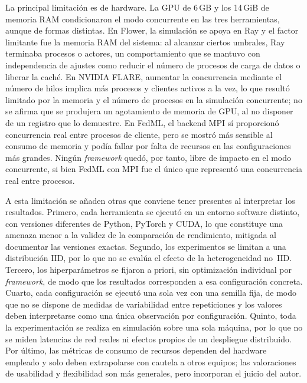 La principal limitación es de hardware. La GPU de 6\,GB y los 14\,GiB de memoria RAM condicionaron
el modo concurrente en las tres herramientas, aunque de formas distintas. En Flower, la simulación
se apoya en Ray y el factor limitante fue la memoria RAM del sistema: al alcanzar ciertos umbrales,
Ray terminaba procesos o actores, un comportamiento que se mantuvo con independencia de ajustes
como reducir el número de procesos de carga de datos o liberar la caché. En NVIDIA FLARE, aumentar
la concurrencia mediante el número de hilos implica más procesos y clientes activos a la vez, lo
que resultó limitado por la memoria y el número de procesos en la simulación concurrente; no se
afirma que se produjera un agotamiento de memoria de GPU, al no disponer de un registro que lo
demuestre. En FedML, el backend MPI sí proporcionó concurrencia real entre procesos de cliente,
pero se mostró más sensible al consumo de memoria y podía fallar por falta de recursos en las
configuraciones más grandes. Ningún \textit{framework} quedó, por tanto, libre de impacto en el
modo concurrente, si bien FedML con MPI fue el único que representó una concurrencia real entre procesos.

A esta limitación se añaden otras que conviene tener presentes al interpretar los resultados.
Primero, cada herramienta se ejecutó en un entorno software distinto, con versiones diferentes de
Python, PyTorch y CUDA, lo que constituye una amenaza menor a la validez de la comparación de
rendimiento, mitigada al documentar las versiones exactas. Segundo, los experimentos se limitan a
una distribución IID, por lo que no se evalúa el efecto de la heterogeneidad no~IID. Tercero, los
hiperparámetros se fijaron a priori, sin optimización individual por \textit{framework}, de modo
que los resultados corresponden a esa configuración concreta. Cuarto, cada configuración se
ejecutó una sola vez con una semilla fija, de modo que no se dispone de medidas de variabilidad
entre repeticiones y los valores deben interpretarse como una única observación por configuración.
Quinto, toda la experimentación se
realiza en simulación sobre una sola máquina, por lo que no se miden latencias de red reales ni
efectos propios de un despliegue distribuido. Por último, las métricas de consumo de recursos
dependen del hardware empleado y solo deben extrapolarse con cautela a otros equipos; las
valoraciones de usabilidad y flexibilidad son más generales, pero incorporan el juicio del autor.

